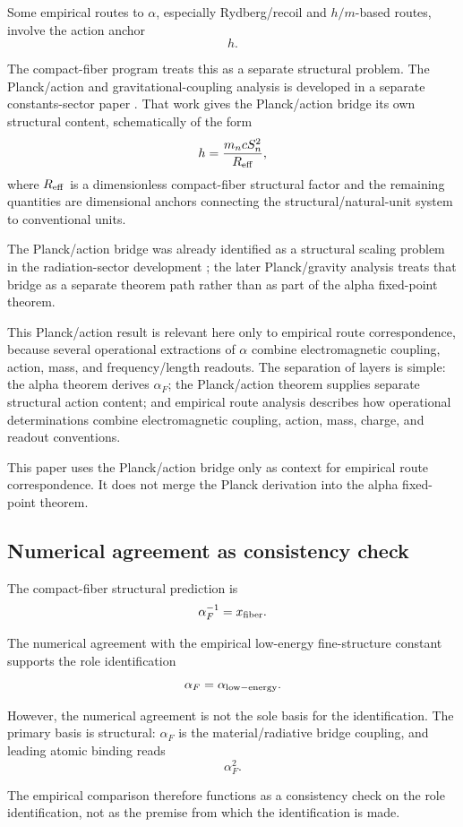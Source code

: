 Some empirical routes to \(\alpha\), especially Rydberg/recoil and
\(h/m\)-based routes, involve the action anchor
\[
h.
\]

The compact-fiber program treats this as a separate structural problem.
The Planck/action and gravitational-coupling analysis is developed in a
separate constants-sector paper \cite{Wells2026PlanckGravity}. That
work gives the Planck/action bridge its own structural content,
schematically of the form
\[
h=\frac{m_n c S_n^2}{R_{\rm eff}},
\]
where \(R_{\rm eff}\) is a dimensionless compact-fiber structural factor
and the remaining quantities are dimensional anchors connecting the
structural/natural-unit system to conventional units.

The Planck/action bridge was already identified as a structural scaling
problem in the radiation-sector development \cite{Wells2026Radiation};
the later Planck/gravity analysis treats that bridge as a separate
theorem path rather than as part of the alpha fixed-point theorem.

This Planck/action result is relevant here only to empirical route
correspondence, because several operational extractions of \(\alpha\)
combine electromagnetic coupling, action, mass, and frequency/length
readouts. The separation of layers is simple: the alpha theorem derives
\(\alpha_F\); the Planck/action theorem supplies separate structural
action content; and empirical route analysis describes how operational
determinations combine electromagnetic coupling, action, mass, charge,
and readout conventions.

This paper uses the Planck/action bridge only as context for empirical
route correspondence. It does not merge the Planck derivation into the
alpha fixed-point theorem.

\subsection{Numerical agreement as consistency check}

The compact-fiber structural prediction is
\[
\alpha_F^{-1}=x_{\rm fiber}.
\]

The numerical agreement with the empirical low-energy fine-structure constant supports the role identification
\[
\alpha_F=\alpha_{\rm low-energy}.
\]

However, the numerical agreement is not the sole basis for the identification. The primary basis is structural: \(\alpha_F\) is the material/radiative bridge coupling, and leading atomic binding reads
\[
\alpha_F^2.
\]

The empirical comparison therefore functions as a consistency check on the role identification, not as the premise from which the identification is made.